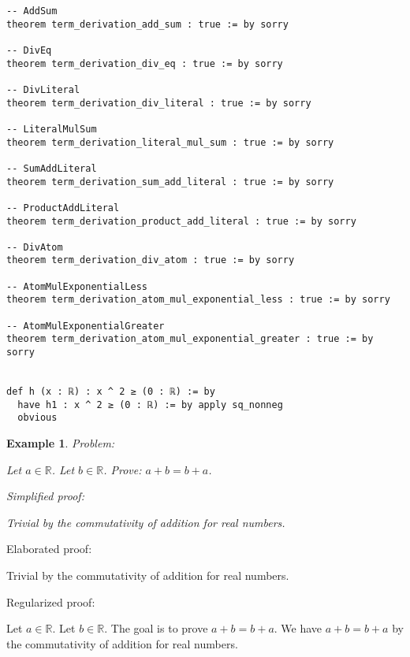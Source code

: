 \documentclass{article}
\newtheorem{example}{Example}
\begin{document}
\begin{tcolorbox}[colback=white!10, width=\linewidth]
\begin{lstlisting}[language=Lean4]
-- AddSum
theorem term_derivation_add_sum : true := by sorry

-- DivEq
theorem term_derivation_div_eq : true := by sorry

-- DivLiteral
theorem term_derivation_div_literal : true := by sorry

-- LiteralMulSum
theorem term_derivation_literal_mul_sum : true := by sorry

-- SumAddLiteral
theorem term_derivation_sum_add_literal : true := by sorry

-- ProductAddLiteral
theorem term_derivation_product_add_literal : true := by sorry

-- DivAtom
theorem term_derivation_div_atom : true := by sorry

-- AtomMulExponentialLess
theorem term_derivation_atom_mul_exponential_less : true := by sorry

-- AtomMulExponentialGreater
theorem term_derivation_atom_mul_exponential_greater : true := by sorry


def h (x : ℝ) : x ^ 2 ≥ (0 : ℝ) := by
  have h1 : x ^ 2 ≥ (0 : ℝ) := by apply sq_nonneg
  obvious

\end{lstlisting}
\end{tcolorbox}


\begin{example}
Problem:
\begin{tcolorbox}[colback=yellow!10, width=\linewidth]
Let $a\in\mathbb{R}$. Let $b\in\mathbb{R}$. Prove: $a+b=b+a$.
\end{tcolorbox}

Simplified proof:
\begin{tcolorbox}[colback=blue!10, width=\linewidth]
Trivial by the commutativity of addition for real numbers.
\end{tcolorbox}
\end{example}

Elaborated proof:
\begin{tcolorbox}[colback=green!10, width=\linewidth]
Trivial by the commutativity of addition for real numbers.
\end{tcolorbox}

Regularized proof:
\begin{tcolorbox}[colback=red!10, width=\linewidth]
Let $a\in\mathbb{R}$.
Let $b\in\mathbb{R}$.
The goal is to prove $a+b=b+a$.
We have $a+b=b+a$ by the commutativity of addition for real numbers.
\end{tcolorbox}
\end{document}

